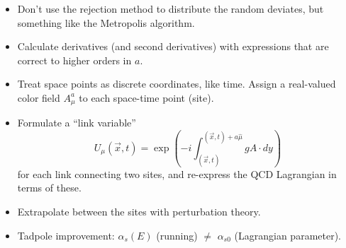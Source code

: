 
\begin{slide*}

\slideframe{}
\LARGE

\begin{minipage}{\linewidth}


\begin{itemize}

  \item Don't use the rejection method to distribute the random
  deviates, but something like the Metropolis algorithm.

  \item Calculate derivatives (and second derivatives) with
  expressions that are correct to higher orders in $a$.

\end{itemize}

\vspace{1cm}


\begin{itemize}

  \item Treat space points as discrete coordinates, like time. Assign
  a real-valued color field $A^a_\mu$ to each space-time point (site).

  \item Formulate a ``link variable''
\[ U_\mu(\vec{x},t) = \exp\left(-i \int_{(\vec{x},t)}^{(\vec{x},t) + a\hat{\mu}}
   g A \cdot dy \right)
\]
  for each link connecting two sites, and re-express the QCD
  Lagrangian in terms of these.

  \item Extrapolate between the sites with perturbation theory.

  \item Tadpole improvement: $\alpha_s(E)$ (running) $\ne$
  $\alpha_{s0}$ (Lagrangian parameter).

\end{itemize}

\end{minipage}

\end{slide*}


